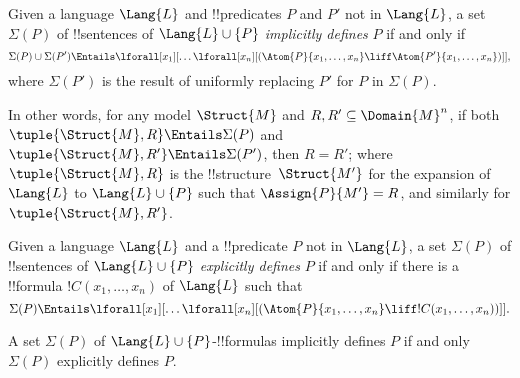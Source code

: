 \documentclass[../../include/open-logic-section]{subfiles}
\begin{document}


\begin{defn}
Given a language $\Lang{L}$ and !!{predicate}s $P$ and $P'$ not in
$\Lang{L}$, a set $\Sigma(P)$ of !!{sentence}s of $\Lang{L} \cup\{P\}$
\emph{implicitly defines} $P$ if and only if
\[
\Sigma(P) \cup \Sigma(P') \Entails \lforall[x_1][\dots
  \lforall[x_n][(\Atom{P}{x_1,\dots, x_n} \liff \Atom{P'}{x_1,\dots,
      x_n})]],
\]
where $\Sigma(P')$ is the result of uniformly replacing $P'$ for $P$
in $\Sigma(P)$.
\end{defn}

In other words, for any model $\Struct{M}$ and $R, R' \subseteq
\Domain{M}^n$, if both $\tuple{\Struct{M},R} \Entails \Sigma(P)$ and
$\tuple{\Struct{M},R'} \Entails \Sigma(P')$, then $R=R'$; where
$\tuple{\Struct{M},R}$ is the !!{structure}~$\Struct{M'}$ for the
expansion of $\Lang{L}$ to $\Lang{L} \cup \{P\}$ such that
$\Assign{P}{M'} = R$, and similarly for $\tuple{\Struct{M}, R'}$.

\begin{defn}
Given a language $\Lang{L}$ and a !!{predicate} $P$ not in $\Lang{L}$,
a set $\Sigma(P)$ of !!{sentence}s of $\Lang{L} \cup\{P\}$
\emph{explicitly defines} $P$ if and only if there is a !!{formula}
$!C(x_1, \dots, x_n)$ of $\Lang{L}$ such that
\[
\Sigma(P) \Entails \lforall[x_1][\dots
  \lforall[x_n][(\Atom{P}{x_1,\dots, x_n} \liff !C(x_1, \dots,
    x_n))]].
\]
\end{defn}

\begin{thm} A set $\Sigma(P)$ of $\Lang{L}
  \cup\{P\}$-!!{formula}s implicitly defines $P$ if and only $\Sigma(P)$
  explicitly defines $P$.
\end{thm}
\end{document}

